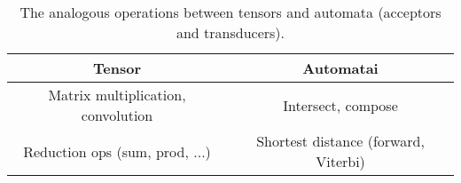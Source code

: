 \documentclass[main.tex]{subfiles}
\begin{document}



\begin{table}[ht]
    \caption{The analogous operations between tensors and
    automata (acceptors and transducers).}
    \centering
    \begin{tabular}{c c}
    \toprule
        Tensor & Automatai \\
    \midrule
        Matrix multiplication, convolution & Intersect, compose \\
        Reduction ops (sum, prod, ...) & Shortest distance (forward, Viterbi) \\
    \bottomrule
    \end{tabular}
    \label{tab:tensor_wfst_analogy}
\end{table}
\end{document}
